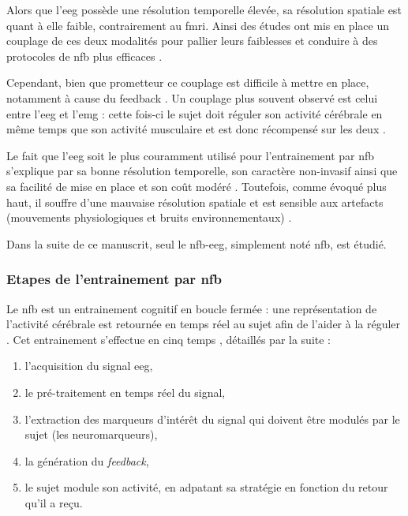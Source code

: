 Alors que l'\gls{eeg} possède une résolution temporelle élevée, sa résolution spatiale est quant à elle faible, 
contrairement au \gls{fmri}. Ainsi des études ont mis en place un couplage de ces deux modalités pour pallier leurs faiblesses et conduire à des 
protocoles de \gls{nfb} plus efficaces \citep{Perronnet2017}. 

Cependant, bien que prometteur ce couplage est difficile à mettre en place, notamment à cause du feedback .
Un couplage plus souvent observé est celui entre l'\gls{eeg} et l'\gls{emg} : cette fois-ci le sujet doit réguler son activité cérébrale en même temps que son
activité musculaire et est donc récompensé sur les deux \citep{Bink2014}.

Le fait que l'\gls{eeg} soit le plus couramment utilisé pour l'entrainement par \gls{nfb} s'explique par sa bonne résolution temporelle, son caractère non-invasif
ainsi que sa facilité de mise en place et son coût modéré \citep{Fovet2016}. Toutefois, comme évoqué plus haut, il souffre d'une mauvaise résolution 
spatiale et est sensible aux artefacts (mouvements physiologiques et bruits environnementaux) \citep{Iwasaki2005, Goncharova2003}. 

Dans la suite de ce manuscrit, seul le \gls{nfb}-\gls{eeg}, simplement noté \gls{nfb}, est étudié. 

\subsubsection{Etapes de l'entrainement par \gls{nfb}}

Le \gls{nfb} est un entrainement cognitif en boucle fermée : une représentation de l'activité cérébrale est retournée en temps réel
au sujet afin de l'aider à la réguler \citep{Enriquez2017}. Cet entrainement s'effectue en cinq temps \citep{Enriquez2017}, détaillés
par la suite :
\begin{enumerate}
\item l'acquisition du signal \gls{eeg}, 
\item le pré-traitement en temps réel du signal,
\item l'extraction des marqueurs d'intérêt du signal qui doivent être modulés par le sujet (les neuromarqueurs),
\item la génération du \textit{feedback},
\item le sujet module son activité, en adpatant sa stratégie en fonction du retour qu'il a reçu. 
\end{enumerate}

